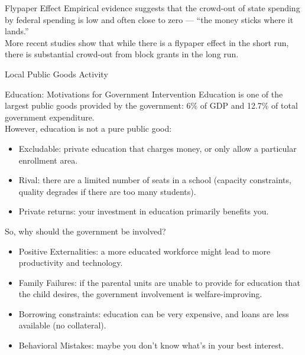 \documentclass[8pt]{extarticle}
\begin{document}
  \begin{problem}{Flypaper Effect}
    Empirical evidence suggests that the crowd-out of state spending by federal spending is low and often close to zero --- ``the money sticks where it lands.''\\

    More recent studies show that while there is a flypaper effect in the short run, there is substantial crowd-out from block grants in the long run.
  \end{problem}
  \begin{problem}{Local Public Goods Activity}
    \begin{tcbraster}[raster columns = 1,colframe = black!75!white,colback=white]
    \end{tcbraster}
  \end{problem}
  \begin{problem}{Education: Motivations for Government Intervention}
    Education is one of the largest public goods provided by the government: 6\% of GDP and 12.7\% of total government expenditure.\\

    However, education is not a pure public good:
    \begin{itemize}
      \item Excludable: private education that charges money, or only allow a particular enrollment area.
      \item Rival: there are a limited number of seats in a school (capacity constraints, quality degrades if there are too many students).
      \item Private returns: your investment in education primarily benefits you.
    \end{itemize}
    So, why should the government be involved?
    \begin{itemize}
      \item Positive Externalities: a more educated workforce might lead to more productivity and technology.
      \item Family Failures: if the parental units are unable to provide for education that the child desires, the government involvement is welfare-improving.
      \item Borrowing constraints: education can be very expensive, and loans are less available (no collateral).
      \item Behavioral Mistakes: maybe you don't know what's in your best interest.
    \end{itemize}
  \end{problem}
\end{document}

